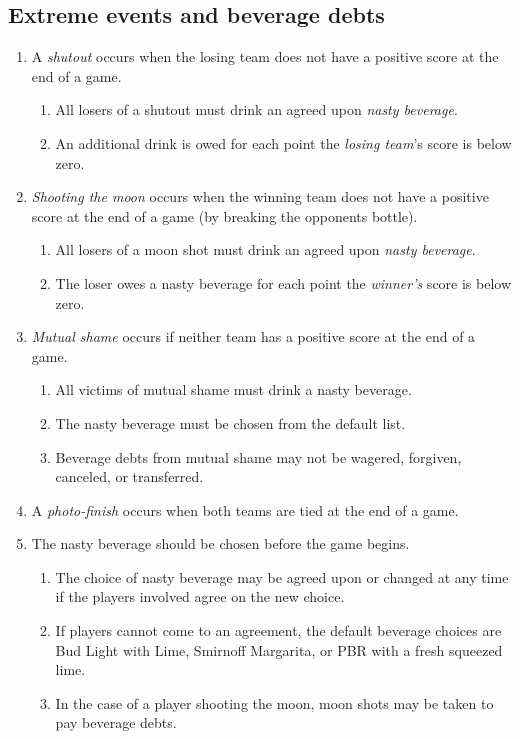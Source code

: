 \documentclass[11pt,letterpaper,twocolumn,english,DIV=calc]{scrartcl}
\begin{document}
\subsection{Extreme events and beverage debts}
\begin{enumerate}[leftmargin=2.8em, label=\thesubsection.\arabic*]
	\item A \emph{shutout} occurs when the losing team does not have a positive score at the end of a game.

	\begin{enumerate}
		\item All losers of a shutout must drink an agreed upon \emph{nasty beverage}.
		\item An additional drink is owed for each point the \emph{losing team}'s score is below zero.
	\end{enumerate}

	\item \emph{Shooting the moon} occurs when the winning team does not have a positive score at the end of a game (by breaking the opponents bottle).

	\begin{enumerate}
		\item All losers of a moon shot must drink an agreed upon \emph{nasty beverage}.
		\item The loser owes a nasty beverage for each point the \emph{winner's} score is below zero.
	\end{enumerate}

	\item \emph{Mutual shame} occurs if neither team has a positive score at the end of a game.

	\begin{enumerate}
		\item All victims of mutual shame must drink a nasty beverage.
		\item The nasty beverage must be chosen from the default list.
		\item Beverage debts from mutual shame may not be wagered, forgiven, canceled, or transferred.
	\end{enumerate}

	\item A \emph{photo-finish} occurs when both teams are tied at the end of a game.
	\item The nasty beverage should be chosen before the game begins.

	\begin{enumerate}
		\item The choice of nasty beverage may be agreed upon or changed at any time if the players involved agree on the new choice.
		\item If players cannot come to an agreement, the default beverage choices are Bud Light with Lime, Smirnoff Margarita, or PBR with a fresh squeezed lime.
		\item In the case of a player shooting the moon, moon shots may be taken to pay beverage debts.
	\end{enumerate}


\end{enumerate}
\end{document}
